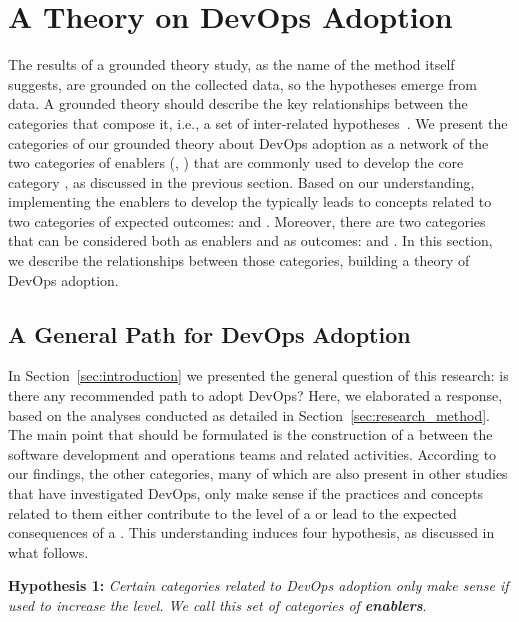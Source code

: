 \section{A Theory on DevOps Adoption} \label{sec:results}

The results of a grounded theory study, as the name of the method itself
suggests, are grounded on the collected data, so the hypotheses emerge from
data. A grounded theory should describe the key relationships between the
categories that compose it, i.e., a set of inter-related hypotheses~\cite{hoda2017becoming}.
We present the categories of our grounded theory
about DevOps adoption as a network of the two categories of enablers (,
) that are commonly used to develop the core category
\cc, as discussed in the previous section. Based on our understanding,
implementing the enablers to develop the \cc typically leads
to concepts related to two categories of expected outcomes:
 and . Moreover, there are two categories that can be considered
both as enablers and as outcomes:  and .
In this section, we describe the relationships between those categories, building a theory
of DevOps adoption.

\subsection{A General Path for DevOps Adoption}

In Section~\ref{sec:introduction} we presented the general question of this
research: is there any recommended path to adopt DevOps? Here, we elaborated a response,
based on the analyses conducted as detailed in Section~\ref{sec:research_method}. The main
point that should be formulated is the construction of a  between the software development and operations teams and
related activities. According to our findings, the other categories,
many of which are also present in other studies that have investigated DevOps,
only make sense if the practices and concepts related to them either contribute to the level of a \cc or lead to the expected consequences
of a \cc. This understanding induces four hypothesis, as discussed in what
follows.

\begin{mh}
\textbf{Hypothesis 1:} \textit{Certain categories related to DevOps adoption
only make sense if used to increase the} \cc \emph{level. We
call this set of categories of \textbf{enablers}}.
\end{mh}

